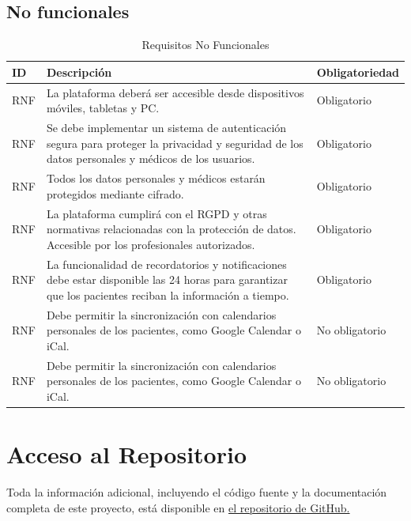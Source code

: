 \documentclass{article}
\begin{document}
\subsection{No funcionales}

\begin{table}[H]
	\centering
	\caption{Requisitos No Funcionales}
	\begin{tabular}{@{} p{2.5cm} p{6.5cm} p{3cm} @{}}
		\toprule
		\textbf{ID} & \textbf{Descripción} & \textbf{Obligatoriedad} \\
		\midrule
		\addlinespace
		\stepcounter{requisitosNoFuncionales} RNF\therequisitosNoFuncionales & La plataforma deberá ser accesible desde dispositivos móviles, tabletas y PC. & Obligatorio \\
		\addlinespace
		\stepcounter{requisitosNoFuncionales} RNF\therequisitosNoFuncionales & Se debe implementar un sistema de autenticación segura para proteger la privacidad y seguridad de los datos personales y médicos de los usuarios. & Obligatorio\\
			\stepcounter{requisitosNoFuncionales} RNF\therequisitosNoFuncionales & Todos los datos personales y médicos estarán protegidos mediante cifrado. & Obligatorio \\
		\addlinespace
		\stepcounter{requisitosNoFuncionales} RNF\therequisitosNoFuncionales &La plataforma cumplirá con el RGPD y otras normativas relacionadas con la protección de datos. Accesible por los profesionales autorizados. & Obligatorio \\
		\addlinespace
		\stepcounter{requisitosNoFuncionales}
		RNF\therequisitosNoFuncionales & La funcionalidad de recordatorios y notificaciones debe estar disponible las 24 horas para garantizar que los pacientes reciban la información a tiempo. & Obligatorio \\
		\addlinespace
		\stepcounter{requisitosNoFuncionales}
		RNF\therequisitosNoFuncionales &  Debe permitir la sincronización con calendarios personales de los pacientes, como Google Calendar o iCal. & No obligatorio \\
		\addlinespace
		\stepcounter{requisitosNoFuncionales}
		RNF\therequisitosNoFuncionales &  Debe permitir la sincronización con calendarios personales de los pacientes, como Google Calendar o iCal. & No obligatorio \\
		\bottomrule
	\end{tabular}
\end{table}
	
	\section{Acceso al Repositorio}
	
	Toda la información adicional, incluyendo el código fuente y la documentación completa de este proyecto, está disponible en  \href{https://github.com/Organizacion-basada-en-componentes/ingenieria_web}{el repositorio de GitHub.} 
	
	
\end{document}
